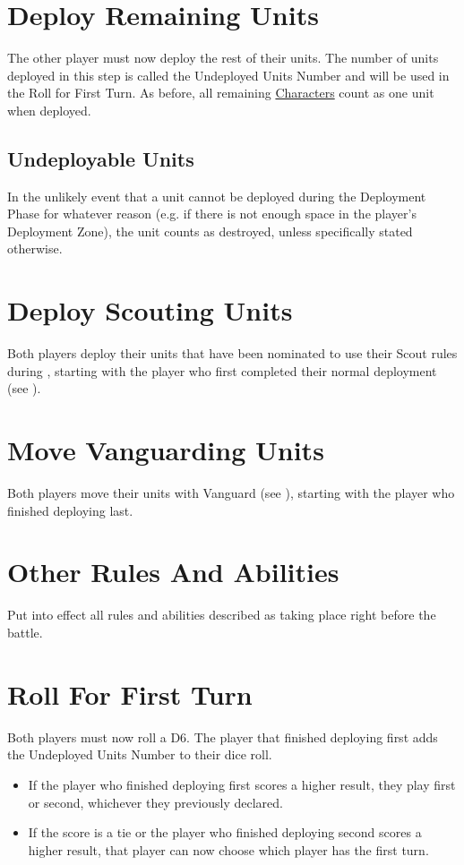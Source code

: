 \section{Deploy Remaining Units}
\label{deploy_remaining_units}

The other player must now deploy the rest of their units. The number of units deployed in this step is called the Undeployed Units Number and will be used in the Roll for First Turn. As before, all remaining \hyperref[characters]{Characters} count as one unit when deployed.

\subsection{Undeployable Units}
\label{undeployable_units}

In the unlikely event that a unit cannot be deployed during the Deployment Phase for whatever reason (e.g. if there is not enough space in the player's Deployment Zone), the unit counts as destroyed, unless specifically stated otherwise.

\section{Deploy Scouting Units}

Both players deploy their units that have been nominated to use their Scout rules during , starting with the player who first completed their normal deployment (see ).

\section{Move Vanguarding Units}

Both players move their units with Vanguard (see ), starting with the player who finished deploying last.

\section{Other Rules And Abilities}
\label{other_rules_and_abilities}

Put into effect all rules and abilities described as taking place right before the battle.

\section{Roll For First Turn}
\label{roll_for_first_turn}

Both players must now roll a D6. The player that finished deploying first adds the Undeployed Units Number to their dice roll.
\begin{itemize}
\item If the player who finished deploying first scores a higher result, they play first or second, whichever they previously declared.
\item If the score is a tie or the player who finished deploying second scores a higher result, that player can now choose which player has the first turn.
\end{itemize}
